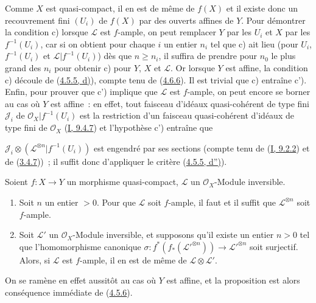 Comme $X$ est quasi-compact, il en est de même de $f(X)$ et il existe donc
un recouvrement fini $(U_i)$ de $f(X)$ par des ouverts affines de $Y$. Pour
démontrer la condition c) lorsque $\mathcal{L}$ est $f$-ample, on peut
remplacer $Y$ par les $U_i$ et $X$ par les $f^{-1}(U_i)$, car si on obtient
pour chaque $i$ un entier $n_i$ tel que c) ait lieu (pour $U_i$,
$f^{-1}(U_i)$ et $\mathcal{L}|f^{-1}(U_i)$) dès que $n\geq n_i$, il
suffira de prendre pour $n_0$ le plus grand des $n_i$ pour obtenir c) pour
$Y$, $X$ et $\mathcal{L}$. Or lorsque $Y$ est affine, la condition c)
découle de (\hyperref[II.4.5.5-fr]{4.5.5, d)}), compte tenu de
(\hyperref[II.4.6.6-fr]{4.6.6}). Il est trivial que c) entraîne c'). Enfin,
pour prouver que c') implique que $\mathcal{L}$ est $f$-ample, on peut
encore se borner au cas où $Y$ est affine~: en effet, tout faisceau
d'idéaux quasi-cohérent de type fini $\mathcal{J}_i$ de
$\mathcal{O}_X|f^{-1}(U_i)$ est la restriction d'un faisceau quasi-cohérent
d'idéaux de type fini de $\mathcal{O}_X$
(\hyperref[I.9.4.7-fr]{I, 9.4.7}) et l'hypothèse c') entraîne que


$\mathcal{J}_i\otimes(\mathcal{L}^{\otimes n}|f^{-1}(U_i))$ est engendré
par ses sections (compte tenu de (\hyperref[I.9.2.2-fr]{I, 9.2.2}) et de
(\hyperref[II.3.4.7-fr]{3.4.7}))~; il suffit donc d'appliquer le critère
(\hyperref[II.4.5.5-fr]{4.5.5, d'')}).

\begin{proposition}[4.6.9]
\label{II.4.6.9-fr}
Soient $f:X\to Y$ un morphisme quasi-compact, $\mathcal{L}$ un
$\mathcal{O}_X$-Module inversible.
\begin{enumerate}
  \item[\rm{(i)}] Soit $n$ un entier $>0$. Pour que $\mathcal{L}$ soit
  $f$-ample, il faut et il suffit que $\mathcal{L}^{\otimes n}$ soit
  $f$-ample.
  \item[\rm{(ii)}] Soit $\mathcal{L}'$ un $\mathcal{O}_X$-Module
  inversible, et supposons qu'il existe un entier $n>0$ tel que
  l'homomorphisme canonique
  $\sigma:f^*(f_*(\mathcal{L}'^{\otimes n}))\to
  \mathcal{L}'^{\otimes n}$ soit surjectif. Alors, si $\mathcal{L}$ est
  $f$-ample, il en est de même de $\mathcal{L}\otimes\mathcal{L}'$.
\end{enumerate}
\end{proposition}

On se ramène en effet aussitôt au cas où $Y$ est affine, et la proposition
est alors conséquence immédiate de (\hyperref[II.4.5.6-fr]{4.5.6}).


